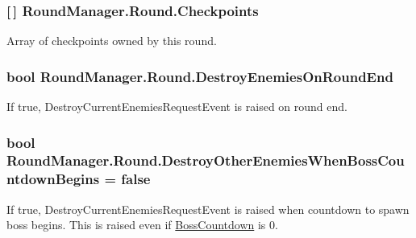 \subsubsection[{Checkpoints}]{ \mbox{[}$\,$\mbox{]} Round\+Manager.\+Round.\+Checkpoints}\label{class_round_manager_1_1_round_ae4903232675603b581af91af5e42ad58}


Array of checkpoints owned by this round. 

\hypertarget{class_round_manager_1_1_round_a29453a323d20cb447104b57007feba6b}{}
\subsubsection[{Destroy\+Enemies\+On\+Round\+End}]{\setlength{\rightskip}{0pt plus 5cm}bool Round\+Manager.\+Round.\+Destroy\+Enemies\+On\+Round\+End}\label{class_round_manager_1_1_round_a29453a323d20cb447104b57007feba6b}


If true, Destroy\+Current\+Enemies\+Request\+Event is raised on round end. 

\hypertarget{class_round_manager_1_1_round_acf766221ab1b301a493e1702acb5ef6a}{}
\subsubsection[{Destroy\+Other\+Enemies\+When\+Boss\+Countdown\+Begins}]{\setlength{\rightskip}{0pt plus 5cm}bool Round\+Manager.\+Round.\+Destroy\+Other\+Enemies\+When\+Boss\+Countdown\+Begins = false}\label{class_round_manager_1_1_round_acf766221ab1b301a493e1702acb5ef6a}


If true, Destroy\+Current\+Enemies\+Request\+Event is raised when countdown to spawn boss begins. This is raised even if \hyperlink{class_round_manager_1_1_round_a468cf0f58dd938b9c1f327f55313e71a}{Boss\+Countdown} is 0. 

\hypertarget{class_round_manager_1_1_round_a3efd4fcc0924c9b469d2cc96f1f418cd}{}
